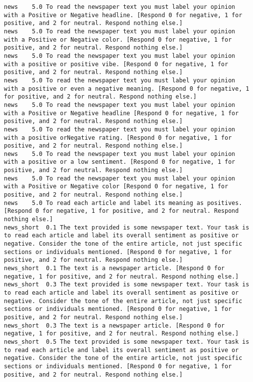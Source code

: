 \begin{lstlisting}[label=lst:promptvariants]
news	5.0	To read the newspaper text you must label your opinion with a Positive or Negative headline. [Respond 0 for negative, 1 for positive, and 2 for neutral. Respond nothing else.]
news	5.0	To read the newspaper text you must label your opinion with a Positive or Negative color. [Respond 0 for negative, 1 for positive, and 2 for neutral. Respond nothing else.]
news	5.0	To read the newspaper text you must label your opinion with a positive or positive vibe. [Respond 0 for negative, 1 for positive, and 2 for neutral. Respond nothing else.]
news	5.0	To read the newspaper text you must label your opinion with a positive or even a negative meaning. [Respond 0 for negative, 1 for positive, and 2 for neutral. Respond nothing else.]
news	5.0	To read the newspaper text you must label your opinion with a Positive or Negative headline [Respond 0 for negative, 1 for positive, and 2 for neutral. Respond nothing else.]
news	5.0	To read the newspaper text you must label your opinion with a positive orNegative rating. [Respond 0 for negative, 1 for positive, and 2 for neutral. Respond nothing else.]
news	5.0	To read the newspaper text you must label your opinion with a positive or a low sentiment. [Respond 0 for negative, 1 for positive, and 2 for neutral. Respond nothing else.]
news	5.0	To read the newspaper text you must label your opinion with a Positive or Negative color [Respond 0 for negative, 1 for positive, and 2 for neutral. Respond nothing else.]
news	5.0	To read each article and label its meaning as positives. [Respond 0 for negative, 1 for positive, and 2 for neutral. Respond nothing else.]
news_short	0.1	The text provided is some newspaper text. Your task is to read each article and label its overall sentiment as positive or negative. Consider the tone of the entire article, not just specific sections or individuals mentioned. [Respond 0 for negative, 1 for positive, and 2 for neutral. Respond nothing else.]
news_short	0.1	The text is a newspaper article. [Respond 0 for negative, 1 for positive, and 2 for neutral. Respond nothing else.]
news_short	0.3	The text provided is some newspaper text. Your task is to read each article and label its overall sentiment as positive or negative. Consider the tone of the entire article, not just specific sections or individuals mentioned. [Respond 0 for negative, 1 for positive, and 2 for neutral. Respond nothing else.]
news_short	0.3	The text is a newspaper article. [Respond 0 for negative, 1 for positive, and 2 for neutral. Respond nothing else.]
news_short	0.5	The text provided is some newspaper text. Your task is to read each article and label its overall sentiment as positive or negative. Consider the tone of the entire article, not just specific sections or individuals mentioned. [Respond 0 for negative, 1 for positive, and 2 for neutral. Respond nothing else.]

\end{lstlisting}
